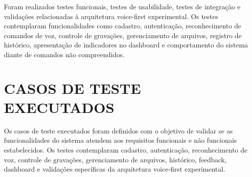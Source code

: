 \documentclass[12pt,oneside,a4paper,brazil,final]{abntex2}
\begin{document}
Foram realizados testes funcionais, testes de usabilidade, testes de integração e validações relacionadas à arquitetura voice-first experimental. Os testes contemplaram funcionalidades como cadastro, autenticação, reconhecimento de comandos de voz, controle de gravações, gerenciamento de arquivos, registro de histórico, apresentação de indicadores no dashboard e comportamento do sistema diante de comandos não compreendidos.



\section{CASOS DE TESTE EXECUTADOS}



Os casos de teste executados foram definidos com o objetivo de validar se as funcionalidades do sistema atendem aos requisitos funcionais e não funcionais estabelecidos. Os testes contemplaram cadastro, autenticação, reconhecimento de voz, controle de gravações, gerenciamento de arquivos, histórico, feedback, dashboard e validações específicas da arquitetura voice-first experimental.
\end{document}
